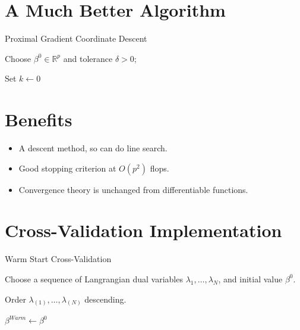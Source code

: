 \documentclass[10pt, reqno]{article}
\numberwithin{equation}{section}
\newcommand{\R}{\mathbb{R}}
\begin{document}
\newpage
\section*{A Much Better Algorithm}

\vspace{.5cm}
\begin{algorithm}[H]
\caption{Proximal Gradient Coordinate Descent}
Choose $\beta^0 \in \R^p$ and tolerance $\delta > 0$;

Set $k \gets 0$

\end{algorithm}

\newpage
\section*{Benefits}

\begin{itemize}
\item A descent method, so can do line search.

\item Good stopping criterion at $O(p^2)$ flops.

\item Convergence theory is unchanged from differentiable functions.

\end{itemize}

\newpage
\section*{Cross-Validation Implementation}

\vspace{.5cm}
\begin{algorithm}[H]
\caption{Warm Start Cross-Validation}
Choose a sequence of Langrangian dual variables $\lambda_1, \ldots, \lambda_N$, and initial value $\beta^0$.

Order $\lambda_{(1)}, \ldots, \lambda_{(N)}$ descending.

$\beta^{Warm} \gets \beta^0$ 


\end{algorithm}
\end{document}
